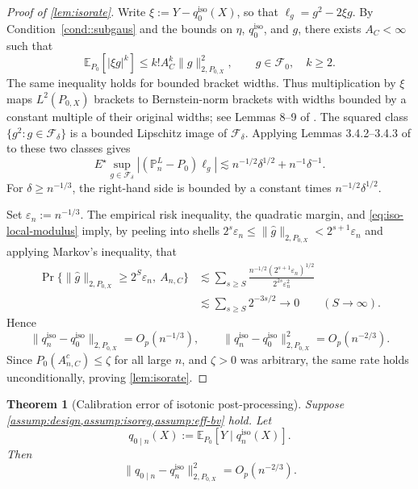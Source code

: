 \documentclass{article}
\theoremstyle{plain}
\newtheorem{theorem}{Theorem}
\theoremstyle{definition}
\newcommand{\E}{\mathbb{E}}
\newcommand{\1}{\mathbf{1}}
\newcommand{\Pl}{\mathbb{P}^{L}_n}
\newcommand{\Px}{P_{0,X}}
\begin{document}
\begin{proof}[Proof of \cref{lem:isorate}]
Write \(\xi:=Y-q_0^{\mathrm{iso}}(X)\), so that \(\ell_g=g^2-2\xi g\). By Condition~\ref{cond::subgaus} and the bounds on \(\eta\), \(q_0^{\mathrm{iso}}\), and \(g\), there exists \(A_C<\infty\) such that
\begin{equation}
\label{eq:iso-multiplier-moments}
\E_{P_0}[|\xi g|^k]
\le k!A_C^k\|g\|_{2,\Px}^2,
\qquad g\in\mathcal F_0,\quad k\ge2.
\end{equation}
The same inequality holds for bounded bracket widths. Thus multiplication by \(\xi\) maps \(L^2(\Px)\) brackets to Bernstein-norm brackets with widths bounded by a constant multiple of their original widths; see Lemmas 8--9 of \citet{Bibaut2019}. The squared class \(\{g^2:g\in\mathcal F_\delta\}\) is a bounded Lipschitz image of \(\mathcal F_\delta\). Applying Lemmas 3.4.2--3.4.3 of \citet{vdvwellner1996} to these two classes gives
\begin{equation}
\label{eq:iso-local-modulus}
E^\star\sup_{g\in\mathcal F_\delta}|(\Pl-P_0)\ell_g|
\lesssim n^{-1/2}\delta^{1/2}+n^{-1}\delta^{-1}.
\end{equation}
For \(\delta\ge n^{-1/3}\), the right-hand side is bounded by a constant times \(n^{-1/2}\delta^{1/2}\).

Set \(\varepsilon_n:=n^{-1/3}\). The empirical risk inequality, the quadratic margin, and \eqref{eq:iso-local-modulus} imply, by peeling into shells \(2^s\varepsilon_n\le\|\hat g\|_{2,\Px}<2^{s+1}\varepsilon_n\) and applying Markov's inequality, that
\[
\begin{aligned}
\Pr\{\|\hat g\|_{2,\Px}\ge2^S\varepsilon_n,\ A_{n,C}\}
&\lesssim
\sum_{s\ge S}
\frac{n^{-1/2}(2^{s+1}\varepsilon_n)^{1/2}}
{2^{2s}\varepsilon_n^2}\\
&\lesssim\sum_{s\ge S}2^{-3s/2}
\longrightarrow0
\qquad(S\to\infty).
\end{aligned}
\]
Hence
\[
\|q_n^{\mathrm{iso}}-q_0^{\mathrm{iso}}\|_{2,\Px}=O_p(n^{-1/3}),
\qquad
\|q_n^{\mathrm{iso}}-q_0^{\mathrm{iso}}\|_{2,\Px}^2=O_p(n^{-2/3}).
\]
Since \(P_0(A_{n,C}^c)\le \zeta\) for all large \(n\), and \(\zeta>0\) was arbitrary, the same rate holds unconditionally, proving \cref{lem:isorate}.
\end{proof}

\begin{theorem}[Calibration error of isotonic post-processing]
\label{thm:iso-postcal}
Suppose \cref{assump:design,assump:isoreg,assump:eff-bv} hold. Let
\[
q_{0\mid n}(X):=\E_{P_0}[Y\mid q_n^{\mathrm{iso}}(X)].
\]
Then
\[
\|q_{0\mid n}-q_n^{\mathrm{iso}}\|_{2,\Px}^2=O_p(n^{-2/3}).
\]
\end{theorem}
\end{document}
